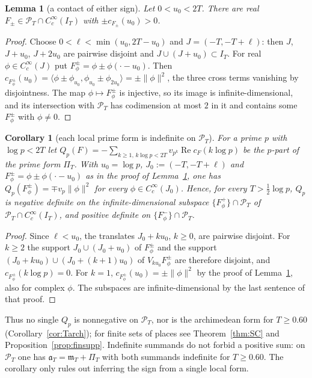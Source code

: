\documentclass[11pt]{amsart}
\newtheorem{lemma}[theorem]{Lemma}
\newtheorem{corollary}[theorem]{Corollary}
\theoremstyle{definition}
\theoremstyle{remark}
\newcommand{\Rel}{\operatorname{Re}}
\newcommand{\PT}{\mathcal P_T}
\newcommand{\IT}{I_T}
\newcommand{\cF}{c_F}
\newcommand{\PiT}{\Pi_T}
\newcommand{\mT}{\mathfrak m_T}
\begin{document}
\begin{lemma}[a contact of either sign]\label{lem:cpos}
Let $0<u_0<2T$. There are real $F_\pm\in\PT\cap C_c^\infty(\IT)$ with $\pm c_{F_\pm}(u_0)>0$.
\end{lemma}
\begin{proof}
Choose $0<\ell<\min(u_0,2T-u_0)$ and $J=(-T,-T+\ell)$: then $J$, $J+u_0$, $J+2u_0$ are pairwise disjoint
and $J\cup(J+u_0)\subset\IT$. For real $\phi\in C_c^\infty(J)$ put $F^\pm_\phi=\phi\pm\phi(\cdot-u_0)$. Then
$c_{F^\pm_\phi}(u_0)=\langle\phi\pm\phi_{u_0},\phi_{u_0}\pm\phi_{2u_0}\rangle=\pm\|\phi\|^2$, the three cross terms
vanishing by disjointness. The map $\phi\mapsto F^\pm_\phi$ is injective, so its image is
infinite-dimensional, and its intersection with $\PT$ has codimension at most $2$ in it and contains some
$F^\pm_\phi$ with $\phi\ne0$.
\end{proof}

\begin{corollary}[each local prime form is indefinite on $\PT$]\label{cor:Qp}
For a prime $p$ with $\log p<2T$ let $Q_p(F)=-\sum_{k\ge1,\,k\log p<2T}v_{p^k}\Rel\cF(k\log p)$ be the
$p$-part of the prime form $\PiT$. With $u_0=\log p$, $J_0:=(-T,-T+\ell)$ and
$F^\pm_\phi=\phi\pm\phi(\cdot-u_0)$ as in the proof of Lemma~\ref{lem:cpos}, one has
$Q_p(F^\pm_\phi)=\mp v_p\|\phi\|^2$ for every $\phi\in C_c^\infty(J_0)$. Hence, for every $T>\frac12\log p$,
$Q_p$ is negative definite on the infinite-dimensional subspace $\{F^+_\phi\}\cap\PT$ of
$\PT\cap C_c^\infty(\IT)$, and positive definite on $\{F^-_\phi\}\cap\PT$.
\end{corollary}
\begin{proof}
Since $\ell<u_0$, the translates $J_0+ku_0$, $k\ge0$, are pairwise disjoint. For $k\ge2$ the support
$J_0\cup(J_0+u_0)$ of $F^\pm_\phi$ and the support $(J_0+ku_0)\cup(J_0+(k+1)u_0)$ of $V_{ku_0}F^\pm_\phi$ are
therefore disjoint, and $c_{F^\pm_\phi}(k\log p)=0$. For $k=1$, $c_{F^\pm_\phi}(u_0)=\pm\|\phi\|^2$ by the proof of
Lemma~\ref{lem:cpos}, also for complex $\phi$. The subspaces are infinite-dimensional by the last sentence of
that proof.
\end{proof}

Thus no single $Q_p$ is nonnegative on $\PT$, nor is the archimedean form for $T\ge0.60$
(Corollary~\ref{cor:Tarch}); for finite sets of places see Theorem~\ref{thm:SC} and
Proposition~\ref{prop:finsupp}. Indefinite summands do not forbid a positive sum: on $\PT$ one has
$\mathfrak a_T=\mT+\PiT$ with both summands indefinite for $T\ge0.60$. The corollary only rules out
inferring the sign from a single local form.
\end{document}
